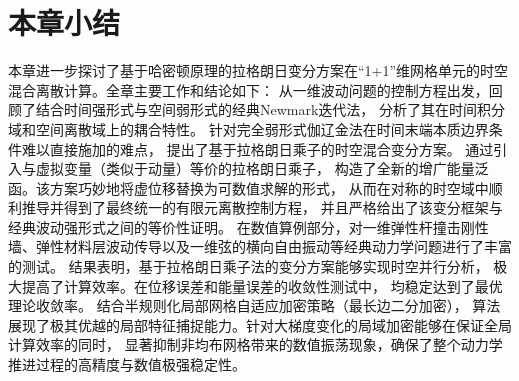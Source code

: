 \section{本章小结}
本章进一步探讨了基于哈密顿原理的拉格朗日变分方案在“1+1”维网格单元的时空混合离散计算。全章主要工作和结论如下：
从一维波动问题的控制方程出发，回顾了结合时间强形式与空间弱形式的经典Newmark迭代法，
分析了其在时间积分域和空间离散域上的耦合特性。
针对完全弱形式伽辽金法在时间末端本质边界条件难以直接施加的难点，
提出了基于拉格朗日乘子的时空混合变分方案。
通过引入与虚拟变量（类似于动量）等价的拉格朗日乘子，
构造了全新的增广能量泛函。该方案巧妙地将虚位移替换为可数值求解的形式，
从而在对称的时空域中顺利推导并得到了最终统一的有限元离散控制方程，
并且严格给出了该变分框架与经典波动强形式之间的等价性证明。
在数值算例部分，对一维弹性杆撞击刚性墙、弹性材料层波动传导以及一维弦的横向自由振动等经典动力学问题进行了丰富的测试。
结果表明，基于拉格朗日乘子法的变分方案能够实现时空并行分析，
极大提高了计算效率。在位移误差和能量误差的收敛性测试中，
均稳定达到了最优理论收敛率。
结合半规则化局部网格自适应加密策略（最长边二分加密），
算法展现了极其优越的局部特征捕捉能力。针对大梯度变化的局域加密能够在保证全局计算效率的同时，
显著抑制非均布网格带来的数值振荡现象，确保了整个动力学推进过程的高精度与数值极强稳定性。

